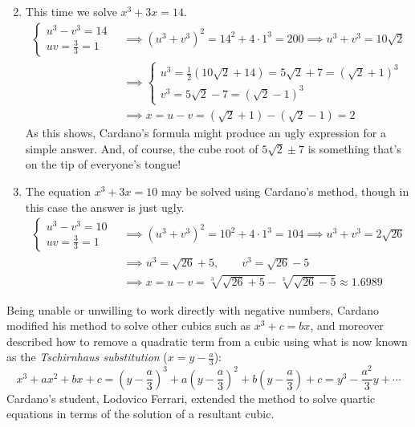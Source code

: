 \begin{enumerate}\setcounter{enumi}{1}
  \item This time we solve $x^3+3x=14$.
	\begin{align*}
		\begin{cases}
			u^3-v^3=14\\
			uv=\frac 33=1
		\end{cases}\ 
		&\implies (u^3+v^3)^2=14^2+4\cdot 1^3=200 \implies u^3+v^3=10\sqrt 2\\[-6pt]
		&\implies
		\begin{cases}
			u^3=\frac 12(10\sqrt 2+14)=5\sqrt 2+7 =(\sqrt 2+1)^3\\
			v^3=5\sqrt 2-7=(\sqrt 2-1)^3
		\end{cases}\\
		&\implies x=u-v=(\sqrt 2+1)-(\sqrt 2-1)=2
	\end{align*}
	As this shows, Cardano's formula might produce an ugly expression for a simple answer. And, of course, the cube root of $5\sqrt 2\pm 7$ is something that's on the tip of everyone's tongue!
	
	\item The equation $x^3+3x=10$ may be solved using Cardano's method, though in this case the answer is just ugly.
	\begin{align*}
		\begin{cases}
			u^3-v^3=10\\
			uv=\frac 33=1
		\end{cases}\ 
		&\implies (u^3+v^3)^2=10^2+4\cdot 1^3=104 \implies u^3+v^3=2\sqrt{26}\\[-3pt]
		&\implies u^3=\sqrt{26}+5,\qquad v^3=\sqrt{26}-5\\
		&\implies x=u-v=\sqrt[3]{\sqrt{26}+5}-\sqrt[3]{\sqrt{26}-5} \approx 1.6989
	\end{align*}
\end{enumerate}


\bigbreak


Being unable or unwilling to work directly with negative numbers, Cardano modified his method to solve other cubics such as $x^3+c=bx$, and moreover described how to remove a quadratic term from a cubic using what is now known as the \emph{Tschirnhaus substitution} ($x=y-\frac a3$):
\[
	x^3+ax^2+bx+c =\left(y-\frac a3\right)^3+a\left(y-\frac a3\right)^2+b\left(y-\frac a3\right)+c =y^3-\frac{a^2}3y+\cdots \tag{$\ast$}
\]
Cardano's student, Lodovico Ferrari, extended the method to solve quartic equations in terms of the solution of a resultant cubic.

